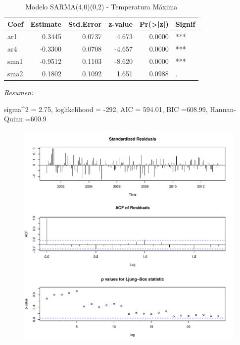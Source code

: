 \documentclass[12pt,oneside]{book}\usepackage[]{graphicx}\usepackage[]{color}
\makeatletter
\def\maxwidth{ %
  \ifdim\Gin@nat@width>\linewidth
    \linewidth
  \else
    \Gin@nat@width
  \fi
}
\newenvironment{knitrout}{}{} %
\theoremstyle{definition} %
\makeatother
\begin{document}
\begin{enumerate}
\begin{knitrout}
\begin{table}
\caption{\label{tab:model_x2}\label{tab:sarma_tmax}Modelo SARMA(4,0)(0,2) - Temperatura Máxima}
\centering
\begin{threeparttable}
\begin{tabular}[t]{lrrrrl}
\toprule
Coef & Estimate & Std.Error & z-value & Pr(>|z|) & Signif\\
\midrule
\rowcolor{gray!6}  ar1 & 0.3445 & 0.0737 & 4.673 & 0.0000 & ***\\
ar4 & -0.3300 & 0.0708 & -4.657 & 0.0000 & ***\\
\rowcolor{gray!6}  sma1 & -0.9512 & 0.1103 & -8.620 & 0.0000 & ***\\
sma2 & 0.1802 & 0.1092 & 1.651 & 0.0988 & .\\
\bottomrule
\end{tabular}
\begin{tablenotes}
\item \textit{Resumen:} 
\item sigma\textasciicircum{}2 = 2.75, loglikelihood = -292, AIC = 594.01, BIC =608.99, Hannan-Quinn =600.9
\end{tablenotes}
\end{threeparttable}
\end{table}


\end{knitrout}






\begin{knitrout}
\color{fgcolor}\begin{figure}[H]

{\centering \includegraphics[width=\maxwidth]{figure/unnamed-chunk-37-1} 

}
\end{figure}
\end{knitrout}
\end{enumerate}
\end{document}
